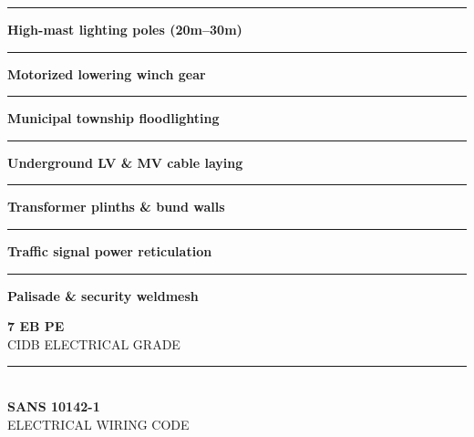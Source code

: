 \documentclass[a4paper,11pt]{article}
\begin{document}
\begin{minipage}[t]{0.34\textwidth}
    \vspace{0pt}
    \begin{tcolorbox}[
        enhanced, colback=mhoffwhite, colframe=mhnavy, boxrule=1pt, arc=4pt,
        title={\bfseries\color{white}\faBolt\ Electrical Scope of Work},
        colbacktitle=mhnavy, left=7pt, right=7pt, top=6pt, bottom=6pt,
        drop shadow=black!6
    ]
        \fontsize{8.1pt}{11.6pt}\selectfont
        \textcolor{mhnavy}{\rule{4pt}{4pt}}\hspace{4pt}\textbf{High-mast lighting poles (20m--30m)}\\
        \textcolor{mhnavy}{\rule{4pt}{4pt}}\hspace{4pt}\textbf{Motorized lowering winch gear}\\
        \textcolor{mhnavy}{\rule{4pt}{4pt}}\hspace{4pt}\textbf{Municipal township floodlighting}\\
        \textcolor{mhnavy}{\rule{4pt}{4pt}}\hspace{4pt}\textbf{Underground LV \& MV cable laying}\\
        \textcolor{mhnavy}{\rule{4pt}{4pt}}\hspace{4pt}\textbf{Transformer plinths \& bund walls}\\
        \textcolor{mhnavy}{\rule{4pt}{4pt}}\hspace{4pt}\textbf{Traffic signal power reticulation}\\
        \textcolor{mhnavy}{\rule{4pt}{4pt}}\hspace{4pt}\textbf{Palisade \& security weldmesh}
    \end{tcolorbox}

    \vspace{0.20cm}

    \begin{tcolorbox}[
        enhanced, colback=white, colframe=mhlightgray, boxrule=0.8pt, arc=4pt,
        left=6pt, right=6pt, top=6pt, bottom=6pt, halign=center,
        drop shadow=black!4
    ]
        {\fontsize{18pt}{20pt}\selectfont\bfseries\color{mhblue}7 EB PE}\\[1pt]
        {\fontsize{7.4pt}{9pt}\selectfont\color{mhtextmuted}\MakeUppercase{CIDB Electrical Grade}}\\[4pt]
        \textcolor{mhlightgray}{\rule{3.2cm}{0.6pt}}\\[4pt]
        {\fontsize{13pt}{15pt}\selectfont\bfseries\color{mhnavy}SANS 10142-1}\\[1pt]
        {\fontsize{7.2pt}{9pt}\selectfont\color{mhtextmuted}\MakeUppercase{Electrical Wiring Code}}
    \end{tcolorbox}
\end{minipage}
\end{document}
